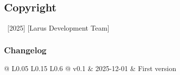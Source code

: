 \subsection*{Copyright}

\textcopyright~[2025] [Larus Development Team]
\vfill

\subsubsection*{Changelog}

\scriptsize

\begin{tabular}{@{} L{0.05\linewidth} L{0.15\linewidth} L{0.6\linewidth} @{}}
\toprule
v0.1 & 2025-12-01 & First version\\
\bottomrule
\end{tabular}
\normalsize
